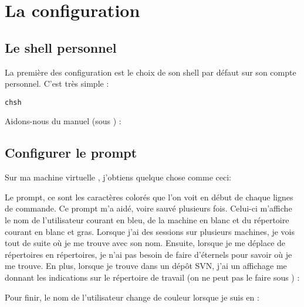 
\section{La configuration}
\subsection{Le shell personnel}
La première des configuration est le choix de son shell par défaut sur son compte personnel. C'est très simple :

\lstset{style=shell}
\begin{lstlisting}[caption=changer de shell]
chsh
\end{lstlisting}

Aidons-nous du manuel (sous \netbsd) :


\subsection{Configurer le prompt}

Sur ma machine virtuelle \netbsd, j'obtiens quelque chose comme ceci:


Le prompt, ce sont les caractères colorés que l'on voit en début de chaque lignes de commande. Ce prompt m'a aidé, voire sauvé plusieurs fois.  Celui-ci m'affiche le nom de l'utilisateur courant en bleu, de la machine en blanc et du répertoire courant en blanc et gras. Lorsque j'ai des sessions sur plusieurs machines, je vois tout de suite où je me trouve avec son nom. Ensuite, lorsque je me déplace de répertoires en répertoires, je n'ai pas besoin de faire d'éternels  pour savoir où je me trouve. En plus, lorsque je trouve dans un dépôt SVN, j'ai un affichage me donnant les indications sur le répertoire de travail (on ne peut pas le faire sous \cygwin) :


Pour finir, le nom de l'utilisateur change de couleur lorsque je suis en  :


